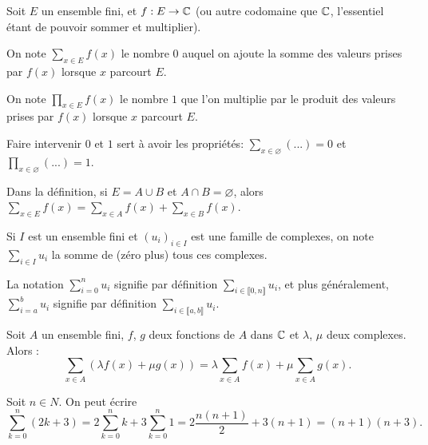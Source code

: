 \begin{definition}
\index{$\sum$}\index{$\prod$}
Soit $E$ un ensemble fini, et $f : E\to \mathbb{C}$ (ou autre codomaine que $\mathbb{C}$, l'essentiel étant de pouvoir sommer et multiplier).

On note $\sum_{x\in E} f(x)$ le nombre $0$ auquel on ajoute la somme des valeurs prises par $f(x)$ lorsque $x$ parcourt $E$.

On note $\prod_{x\in E} f(x)$ le nombre $1$ que l'on multiplie par le produit des valeurs prises par $f(x)$ lorsque $x$ parcourt $E$.
\end{definition}

\begin{remarque}
Faire intervenir $0$ et $1$ sert à avoir les propriétés: $\sum_{x\in \varnothing} (...)=0$ et $\prod_{x\in \varnothing} (...) = 1$.
\end{remarque}

\begin{remarque} Dans la définition, si $E=A\cup B$ et $A\cap B = \varnothing$, alors $\sum_{x\in E}f(x) = \sum_{x\in A}f(x)+\sum_{x\in B}f(x)$.
\end{remarque}

Si $I$ est un ensemble fini et $(u_i)_{i\in I}$ est une famille de complexes, on note $\sum_{i\in I} u_i$ la somme de (zéro plus) tous ces complexes. 

\begin{definition}
La notation $\sum_{i=0}^n u_i$ signifie par définition $\sum_{i\in \llbracket 0,n\rrbracket} u_i$, et plus généralement,  $\sum_{i=a}^b u_i$ signifie par définition $\sum_{i\in \llbracket a,b\rrbracket} u_i$. 
\end{definition}

\begin{proposition}
Soit $A$ un ensemble fini, $f$, $g$ deux fonctions de $A$ dans $\mathbb{C}$ et $\lambda$, $\mu$ deux complexes. Alors :
\[
\sum_{x\in A}(\lambda f(x)+\mu g(x)) 
= \lambda\sum_{x\in A}f(x)+ \mu\sum_{x\in A} g(x).
\]
\end{proposition}

\begin{exemple}
Soit $n\in N$. On peut écrire 
\[
\sum_{k=0}^n (2k+3) 
= 2\sum_{k=0}^n k + 3\sum_{k=0}^n1 
= 2\frac{n(n+1)}{2}+3(n+1) 
= (n+1)(n+3).
\]
\end{exemple}

